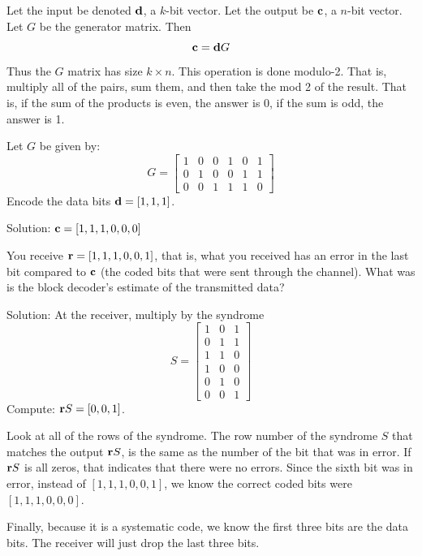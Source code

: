 Let the input be denoted $\mathbf{d}$, a $k$-bit vector.
Let the output be $\mathbf{c}$, a $n$-bit vector.  Let $G$ be the generator matrix.  Then 
\[
\mathbf{c} = \mathbf{d}  G
\]
Thus the $G$ matrix has size $k \times n$.  This operation is done modulo-2.  That is, multiply all of the pairs, sum them, and then take the mod 2 of the result.  That is, if the sum of the products is even, the answer is 0, if the sum is odd, the answer is 1.


 Let $G$ be given by:
\[
G = \left[ \begin{array}{cccccc}
1 & 0 & 0 & 1 & 0 & 1 \\
0 & 1 & 0 & 0 & 1 & 1 \\
0 & 0 & 1 & 1 & 1 & 0 
\end{array} \right]
\]
Encode the data bits $\mathbf{d} = [1, 1, 1]$.

Solution: $\mathbf{c}  =[ 1, 1, 1, 0, 0, 0]$

You receive $\mathbf{r} = [ 1, 1, 1, 0, 0, 1]$, that is, what you received has an error in the last bit compared to $\mathbf{c}$ (the coded bits that were sent through the channel).  What was is the block decoder's estimate of the transmitted data?

Solution: At the receiver, multiply by the syndrome 
\[
S = \left[ \begin{array}{ccc}
1 & 0 & 1 \\
0 & 1 & 1 \\
1 & 1 & 0 \\
1 & 0 & 0 \\
0 & 1 & 0 \\
0 & 0 & 1 
\end{array} \right]
\]
Compute: $\mathbf{r} S = [ 0, 0, 1]$.

Look at all of the rows of the syndrome.  The row number of the syndrome $S$ that matches the output $\mathbf{r} S$, is the same as the number of the bit that was in error.  If $\mathbf{r} S$ is all zeros, that indicates that there were no errors.  Since the sixth bit was in error, instead of $[ 1, 1, 1, 0, 0, 1]$, we know the correct coded bits were $[1, 1, 1, 0, 0, 0]$.

Finally, because it is a systematic code, we know the first three bits are the data bits.  The receiver will just drop the last three bits.

